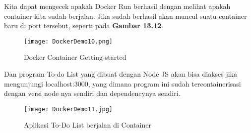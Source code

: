 Kita dapat mengecek apakah Docker Run berhasil dengan melihat apakah container kita sudah berjalan. Jika sudah berhasil akan muncul suatu container baru di port tersebut, seperti pada \textbf{Gambar 13.12}.

\begin{figure}[h]
	\centering
	\texttt{[image: DockerDemo10.png]}
	\caption{Docker Container Getting-started}
	\label{fig:DockerDemo10}
\end{figure}

\pagebreak Dan program To-do List yang dibuat dengan Node JS akan bisa diakses jika mengunjungi localhost:3000, yang dimana program ini sudah tercontainerisasi dengan versi node nya sendiri dan dependencynya sendiri.

\begin{figure}[h]
	\centering
	\texttt{[image: DockerDemo11.jpg]}
	\caption{Aplikasi To-Do List berjalan di Container}
	\label{fig:DockerDemo11}
\end{figure}
